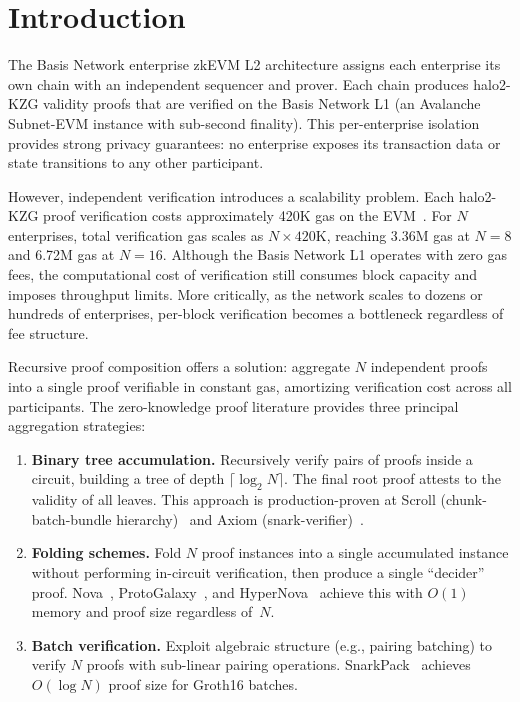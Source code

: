 \section{Introduction}
\label{sec:introduction}

The Basis Network enterprise zkEVM L2 architecture assigns each
enterprise its own chain with an independent sequencer and prover. Each
chain produces halo2-KZG validity proofs that are verified on the Basis
Network L1 (an Avalanche Subnet-EVM instance with sub-second finality).
This per-enterprise isolation provides strong privacy guarantees: no
enterprise exposes its transaction data or state transitions to any
other participant.

However, independent verification introduces a scalability problem.
Each halo2-KZG proof verification costs approximately 420K gas on the
EVM~\cite{axiom-v2, orbiter-gas}. For $N$ enterprises, total
verification gas scales as $N \times 420\text{K}$, reaching 3.36M gas
at $N{=}8$ and 6.72M gas at $N{=}16$. Although the Basis Network L1
operates with zero gas fees, the computational cost of verification
still consumes block capacity and imposes throughput limits. More
critically, as the network scales to dozens or hundreds of enterprises,
per-block verification becomes a bottleneck regardless of fee structure.

Recursive proof composition offers a solution: aggregate $N$ independent
proofs into a single proof verifiable in constant gas, amortizing
verification cost across all participants. The zero-knowledge proof
literature provides three principal aggregation strategies:

\begin{enumerate}
  \item \textbf{Binary tree accumulation.} Recursively verify pairs of
    proofs inside a circuit, building a tree of depth
    $\lceil \log_2 N \rceil$. The final root proof attests to the
    validity of all leaves. This approach is production-proven at Scroll
    (chunk-batch-bundle hierarchy)~\cite{scroll-darwin} and Axiom
    (snark-verifier)~\cite{axiom-v2, snark-verifier}.

  \item \textbf{Folding schemes.} Fold $N$ proof instances into a single
    accumulated instance without performing in-circuit verification,
    then produce a single ``decider'' proof. Nova~\cite{nova},
    ProtoGalaxy~\cite{protogalaxy}, and HyperNova~\cite{hypernova}
    achieve this with $O(1)$ memory and proof size regardless of~$N$.

  \item \textbf{Batch verification.} Exploit algebraic structure
    (e.g., pairing batching) to verify $N$ proofs with sub-linear
    pairing operations. SnarkPack~\cite{snarkpack} achieves
    $O(\log N)$ proof size for Groth16 batches.
\end{enumerate}

